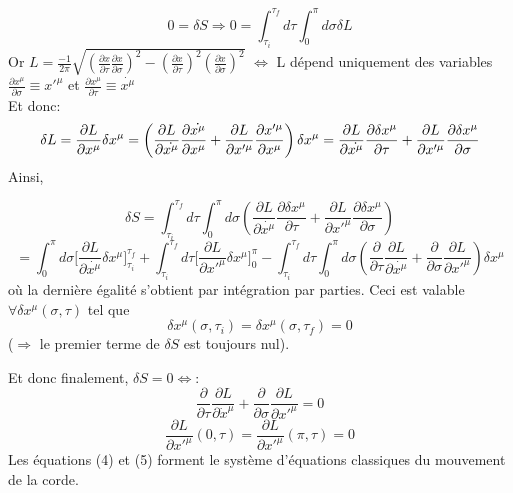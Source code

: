 \documentclass[a4paper,12pt]{article}
\begin{document}
\begin{equation}
0=\delta S
\Rightarrow
0=\int_{\tau_{i}}^{\tau_{f}}d\tau\int_{0}^{\pi}d\sigma\delta L
\end{equation}
Or $L=\frac{-1}{2\pi}\sqrt{\left( \frac{\partial x}{\partial \tau}\frac{\partial x}{\partial \sigma}\right)^{2}-\left( \frac{\partial x}{\partial \tau}\right) ^{2}\left( \frac{\partial x}{\partial \sigma}\right) ^{2}}$ $\Leftrightarrow$ L dépend uniquement des variables $ \frac{\partial x^{\mu}}{\partial \sigma}\equiv x'^{\mu}$ et $\frac{\partial x^{\mu}}{\partial \tau}\equiv \dot{x^{\mu}}$\\
Et donc:
\begin{equation}
\delta L= \frac{\partial L}{\partial x^{\mu}}\delta x^{\mu}=\left( \frac{\partial L}{\partial \dot{x^{\mu}}}\frac{\partial \dot{x^{\mu}}}{\partial x^{\mu}}+\frac{\partial L}{\partial x'^{\mu}}\frac{\partial x'^{\mu}}{\partial x^{\mu}}\right) \delta x^{\mu}\\
=\frac{\partial L}{\partial \dot{x^{\mu}}}\frac{\partial\delta x^{\mu}}{\partial \tau}+\frac{\partial L}{\partial x'^{\mu}}\frac{\partial\delta x^{\mu}}{\partial \sigma}
\end{equation}
Ainsi,

$$\delta S=\int_{\tau_{i}}^{\tau_{f}}d\tau\int_{0}^{\pi}d\sigma\left( \frac{\partial L}{\partial \dot{x^{\mu}}}\frac{\partial\delta x^{\mu}}{\partial \tau}+\frac{\partial L}{\partial x'^{\mu}}\frac{\partial\delta x^{\mu}}{\partial \sigma}\right) $$
$$=\int_{0}^{\pi}d\sigma \Big[\frac{\partial L}{\partial \dot{x^{\mu}}}\delta x^{\mu}\Big]^{\tau_{f}}_{\tau_{i}}+\int_{\tau_{i}}^{\tau_{f}}d\tau \Big[\frac{\partial L}{\partial x'^{\mu}}\delta x^{\mu}\Big]^{\pi}_{0}-\int_{\tau_{i}}^{\tau_{f}}d\tau\int_{0}^{\pi}d\sigma\left( \frac{\partial}{\partial \tau}\frac{\partial L}{\partial \dot{x^{\mu}}}+\frac{\partial}{\partial \sigma}\frac{\partial L}{\partial x'^{\mu}}\right)\delta x^{\mu}$$
où la dernière égalité s'obtient par intégration par parties.
Ceci est valable $\forall \delta x^{\mu}(\sigma,\tau)$ tel que 
$$\delta x^{\mu}(\sigma,\tau_{i})=\delta x^{\mu}(\sigma,\tau_{f})=0$$
($\Rightarrow$ le premier terme de $\delta S$ est toujours nul).

Et donc finalement, $\delta S=0 \Leftrightarrow$:
\begin{equation}
    \frac{\partial}{\partial \tau}\frac{\partial L}{\partial \dot x^{\mu}}+\frac{\partial}{\partial \sigma}\frac{\partial L}{\partial  x'^{\mu}}=0
\end{equation}
\begin{equation}
    \frac{\partial L}{\partial x'^{\mu}}(0, \tau)=\frac{\partial L}{\partial x'^{\mu}}(\pi, \tau)=0   
\end{equation}
Les équations (4) et (5) forment le système d'équations classiques du mouvement de la corde. 
\end{document}
